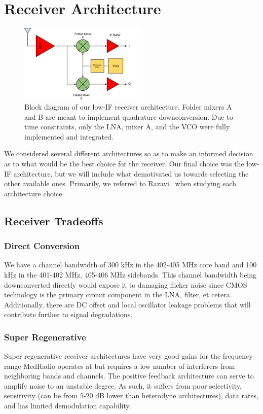 \section{Receiver Architecture}

\begin{figure}[h]
   \centering
    \includegraphics[width=0.55\textwidth]{figures/receiver}
    \caption{
        Block diagram of our low-IF receiver architecture. Folder mixers A and B are meant to implement quadrature downconversion. Due to time constraints, only the LNA, mixer A, and the VCO were fully implemented and integrated.
    }
    \label{fig:receiver}
\end{figure}

We considered several different architectures so as to make an informed decision as to what would be the best choice for the receiver. Our final choice was the low-IF architecture, but we will include what demotivated us towards selecting the other available ones. Primarily, we referred to Razavi~\cite{Razavi} when studying each architecture choice.


\subsection{Receiver Tradeoffs}
\subsubsection{Direct Conversion}
We have a channel bandwidth of 300 kHz in the 402-405 MHz core band and 100 kHz in the 401-402 MHz, 405-406 MHz sidebands. This channel bandwidth being downconverted directly would expose it to damaging flicker noise since CMOS technology is the primary circuit component in the LNA, filter, et cetera. Additionally, there are DC offset	 and local oscillator leakage problems that will contribute further to signal degradations.

\subsubsection{Super Regenerative}
Super regenerative receiver architectures have very good gains for the frequency range MedRadio operates at but requires a low number of interferers from neighboring bands and channels. The positive feedback architecture can serve to amplify noise to an unstable degree. As such, it suffers from poor selectivity, sensitivity (can be from 5-20 dB lower than heterodyne architectures), data rates, and has limited demodulation capability. 

